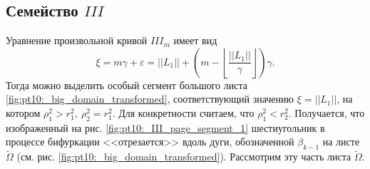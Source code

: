 \subsection{Семейство $III$}
Уравнение произвольной кривой $III_m$ имеет вид 
$$\xi = m \gamma + \varepsilon = ||L_1|| + \left(m - \left\lfloor \frac{||L_1||}{\gamma} \right\rfloor \right) \gamma.$$
Тогда можно выделить особый сегмент большого листа \ref{fig:pt10:_big_domain_transformed}, соответствующий значению $\xi=||L_1||$, на котором $\rho_1^2 > r_1^2, \ \rho_2^2 = r_1^2$.
Для конкретности считаем, что $\rho_1^2 < r_2^2$.
Получается, что изображенный на рис. \ref{fig:pt10:_III_page_segment_1} шестиугольник в процессе бифуркации <<отрезается>> вдоль дуги, обозначенной $\beta_{k-1}$ на листе $\widetilde{\Omega}$ (см. рис. \ref{fig:pt10:_big_domain_transformed}). 
Рассмотрим эту часть листа $\widetilde{\Omega}$.
